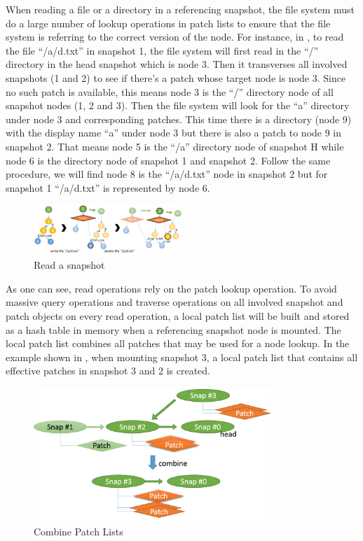     When reading a file or a directory in a referencing snapshot, the file system must do a large number of lookup operations in patch lists to ensure that the file system is referring to the correct version of the node. For instance, in , to read the file ``/a/d.txt'' in snapshot 1, the file system will first read in the ``/'' directory in the head snapshot which is node 3. Then it transverses all involved snapshots (1 and 2) to see if there's a patch whose target node is node 3. Since no such patch is available, this means node 3 is the ``/'' directory node of all snapshot nodes (1, 2 and 3). Then the file system will look for the ``a'' directory under node 3 and corresponding patches. This time there is a directory (node 9) with the display name ``a'' under node 3 but there is also a patch to node 9 in snapshot 2. That means node 5 is the ``/a'' directory node of snapshot H while node 6 is the directory node of snapshot 1 and snapshot 2. Follow the same procedure, we will find node 8 is the ``/a/d.txt'' node in snapshot 2 but for snapshot 1 ``/a/d.txt'' is represented by node 6.

\begin{figure}[t]
\centering
\includegraphics[width=0.5\textwidth]{Chapter-4/figs/fig18.png}
\caption{Read a snapshot}
\label{fig:read_patches}
\end{figure}

    As one can see, read operations rely on the patch lookup operation. To avoid massive query operations and traverse operations on all involved snapshot and patch objects on every read operation, a local patch list will be built and stored as a hash table in memory when a referencing snapshot node is mounted. The local patch list combines all patches that may be used for a node lookup. In the example shown in , when mounting snapshot 3, a local patch list that contains all effective patches in snapshot 3 and 2 is created.

\begin{figure}[t]
\centering
\includegraphics[width=0.8\textwidth]{Chapter-4/figs/fig15.png}
\caption{Combine Patch Lists}
\label{fig:combine_patch_list}
\end{figure}


